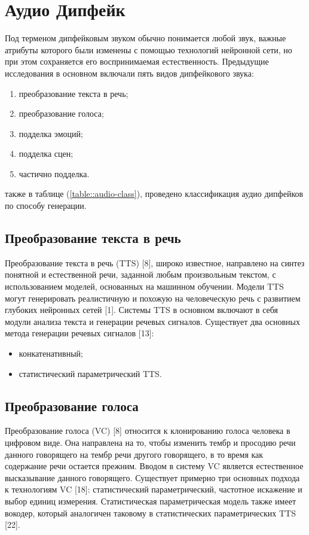 \chapter{Аудио Дипфейк}

Под терменом дипфейковым звуком обычно понимается любой звук, важные атрибуты которого были изменены с помощью технологий нейронной сети, но при этом сохраняется его воспринимаемая естественность. Предыдущие исследования в основном включали пять видов дипфейкового звука:

\begin{enumerate}
    \item преобразование текста в речь;
    \item преобразование голоса; 
    \item подделка эмоций;
    \item подделка сцен;
    \item частично подделка.
\end{enumerate}

также в таблице (\ref{table::audio-class}), проведено классификация аудио дипфейков по способу генерации.

\section{Преобразование текста в речь}

Преобразование текста в речь (TTS) [8], широко известное, направлено на синтез понятной и естественной речи, заданной любым произвольным текстом, с использованием моделей, основанных на машинном обучении. Модели TTS могут генерировать реалистичную и похожую на человеческую речь с развитием глубоких нейронных сетей [1]. Системы TTS в основном включают в себя модули анализа текста и генерации речевых сигналов. Существует два основных метода генерации речевых сигналов [13]: 

\begin{itemize}
    \item конкатенативный;
    \item статистический параметрический TTS.
\end{itemize}

\section{Преобразование голоса} 

Преобразование голоса (VC) [8] относится к клонированию голоса человека в цифровом виде. Она направлена на то, чтобы изменить тембр и просодию речи данного говорящего на тембр речи другого говорящего, в то время как содержание речи остается прежним. Вводом в систему VC является естественное высказывание данного говорящего. Существует примерно три основных подхода к технологиям VC [18]: статистический параметрический, частотное искажение и выбор единиц измерения. Статистическая параметрическая модель также имеет вокодер, который аналогичен таковому в статистических параметрических TTS [22].

